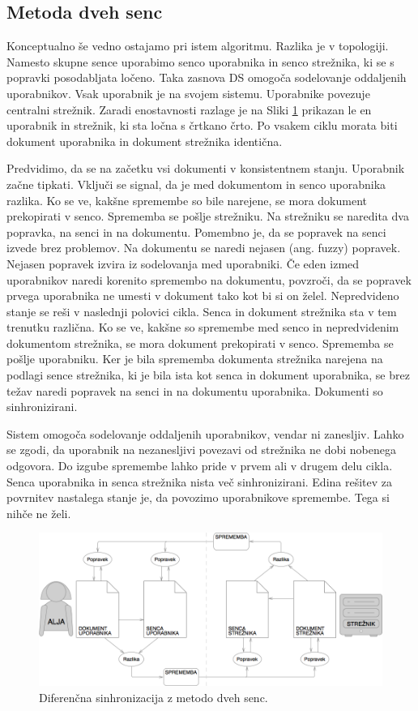 \documentclass[a4paper, 12pt, twoside]{book}
\begin{document}
\subsection{Metoda dveh senc}

Konceptualno še vedno ostajamo pri istem algoritmu. Razlika je v topologiji. Namesto skupne sence uporabimo senco uporabnika in senco strežnika, ki se s popravki posodabljata ločeno. Taka zasnova DS omogoča sodelovanje oddaljenih uporabnikov. Vsak uporabnik je na svojem sistemu. Uporabnike povezuje centralni strežnik. Zaradi enostavnosti razlage je na Sliki \ref{ds2} prikazan le en uporabnik in strežnik, ki sta ločna s črtkano črto. Po vsakem ciklu morata biti dokument uporabnika in dokument strežnika identična.

Predvidimo, da se na začetku vsi dokumenti v konsistentnem stanju. Uporabnik začne tipkati. Vključi se signal, da je med dokumentom in senco uporabnika razlika. Ko se ve, kakšne spremembe so bile narejene, se mora dokument prekopirati v senco. Sprememba se pošlje strežniku. Na strežniku se naredita dva popravka, na senci in na dokumentu. Pomembno je, da se popravek na senci izvede brez problemov. Na dokumentu se naredi nejasen (ang. fuzzy) popravek. Nejasen popravek izvira iz sodelovanja med uporabniki. Če eden izmed uporabnikov naredi korenito spremembo na dokumentu, povzroči, da se popravek prvega uporabnika ne umesti v dokument tako kot bi si on želel. Nepredvideno stanje se reši v naslednji polovici cikla. Senca in dokument strežnika sta v tem trenutku različna. Ko se ve, kakšne so spremembe med senco in nepredvidenim dokumentom strežnika, se mora dokument prekopirati v senco. Sprememba se pošlje uporabniku. Ker je bila sprememba dokumenta strežnika narejena na podlagi sence strežnika, ki je bila ista kot senca in dokument uporabnika, se brez težav naredi popravek na senci in na dokumentu uporabnika. Dokumenti so sinhronizirani.

Sistem omogoča sodelovanje oddaljenih uporabnikov, vendar ni zanesljiv. Lahko se zgodi, da uporabnik na nezanesljivi povezavi od strežnika ne dobi nobenega odgovora. Do izgube spremembe lahko pride v prvem ali v drugem delu cikla. Senca uporabnika in senca strežnika nista več sinhronizirani. Edina rešitev za povrnitev nastalega stanje je, da povozimo uporabnikove spremembe. Tega si nihče ne želi.

\begin{figure}[placement h]
\begin{center}
\includegraphics[width=11.83cm]{ds2.png}
\end{center}
\caption{Diferenčna sinhronizacija z metodo dveh senc.}
\label{ds2}
\end{figure}
\end{document}

